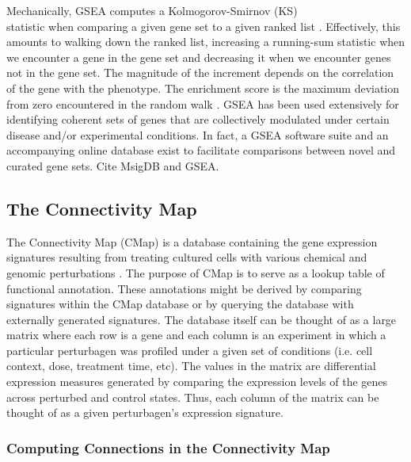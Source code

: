 \documentclass[12pt]{article}
\begin{document}
Mechanically, GSEA computes a Kolmogorov-Smirnov (KS)\\
 statistic when comparing a given gene set to a given ranked list \cite{hollander_wolfe_1975}. Effectively, this amounts to walking down the ranked list, increasing a running-sum statistic when we encounter a gene in the gene set and decreasing it when we encounter genes not in the gene set. The magnitude of the increment depends on the correlation of the gene with the phenotype. The enrichment score is the maximum deviation from zero encountered in the random walk \cite{subramanian_gene_2005}. GSEA has been used extensively for identifying coherent sets of genes that are collectively modulated under certain disease and/or experimental conditions. In fact, a GSEA software suite and an accompanying online database exist to facilitate comparisons between novel and curated gene sets.  Cite MsigDB and GSEA. 

\subsection{The Connectivity Map}

The Connectivity Map (CMap) is a database containing the gene expression signatures resulting from treating cultured cells with various chemical and genomic perturbations \cite{lamb_connectivity_2006}. The purpose of CMap is to serve as a lookup table of functional annotation. These annotations might be derived by comparing signatures within the CMap database or by querying the database with externally generated signatures. The database itself can be thought of as a large matrix where each row is a gene and each column is an experiment in which a particular perturbagen was profiled under a given set of conditions (i.e. cell context, dose, treatment time, etc). The values in the matrix are differential expression measures generated by comparing the expression levels of the genes across perturbed and control states. Thus, each column of the matrix can be thought of as a given perturbagen's expression signature.

\subsubsection{Computing Connections in the Connectivity Map}
\end{document}
